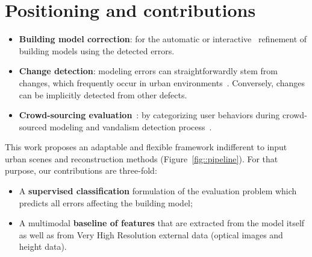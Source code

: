     \section{Positioning and contributions}
        \begin{itemize}
            \item \textbf{Building model correction}: for the automatic or interactive~\citep{kowdle2011active} refinement of building models using the detected errors.
            \item \textbf{Change detection}: modeling errors can straightforwardly stem from changes, which frequently occur in urban environments~\citep{taneja2015geometric}. Conversely, changes can be implicitly detected from other defects.
            \item \textbf{Crowd-sourcing evaluation}~\citep{kovashka2016crowdsourcing}: by categorizing user behaviors during crowd-sourced modeling and vandalism detection process~\citep{neis2012towards}.
        \end{itemize}
        
        This work proposes an adaptable and flexible framework indifferent to input urban scenes and reconstruction methods (Figure~\ref{fig::pipeline}). For that purpose, our contributions are three-fold:
        \begin{itemize}
            \item A \textbf{supervised classification} formulation of the evaluation problem which predicts all errors affecting the building model;
            \item A multimodal \textbf{baseline of features} that are extracted from the model itself as well as from Very High Resolution external data (optical images and height data).
        \end{itemize}
    
